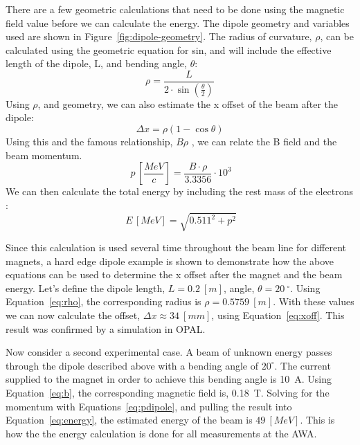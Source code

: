 There are a few geometric calculations that need to be done using the magnetic field value
before we can calculate the energy. The dipole geometry and variables used are shown in Figure~\ref{fig:dipole-geometry}.
The radius of curvature, $\rho$, can be calculated using the geometric equation for sin, and 
will include the effective length of the dipole, L, and bending angle, $\theta$:
\begin{equation}
	\rho = \frac{L}{2\cdot \sin(\frac{\theta}{2})}
\end{equation}\label{eq:rho}
Using $\rho$, and geometry, we can also estimate the x offset of the
beam after the dipole: 
\begin{equation}
	\Delta x = \rho \left( 1- \cos\theta \right)
\end{equation}\label{eq:xoff}
Using this and the famous relationship, $B\rho$ \cite{Wiedemann},
we can relate the B field and the beam momentum. %
\begin{equation}
	\SI{}{p\,\left[\frac{MeV}{c}\right]} = \frac{B\cdot \rho}{3.3356}\cdot 10^3
	\label{eq:pdipole}
\end{equation}
We can then calculate the total energy by including the rest mass of the electrons \cite{Griffiths}:
\begin{equation}
	\SI{}{E\,[MeV]} = \sqrt{0.511^2+p^2}
	\label{eq:energy}
\end{equation}

Since this calculation is used several time throughout the 
beam line for different magnets, a hard edge dipole example is shown 
to demonstrate how the above equations can be used to determine
the x offset after the magnet and the beam energy. 
Let's define the dipole length, $L=\SI{0.2}{[m]}$, angle, $\theta=\SI{20}{^\circ}$. 
Using Equation~\ref{eq:rho}, 
the corresponding radius is $\rho = \SI{0.5759}{[m]}$. 
With these values we can now calculate the offset, $\Delta x \approx \SI{34}{[mm]}$, 
using Equation~\ref{eq:xoff}. This result was confirmed by a simulation in OPAL. 

Now consider a second experimental case.
A beam of unknown energy passes through the dipole described above
with a bending angle of $20^\circ$. 
The current supplied to the magnet in order to achieve this bending angle is \SI{10}{A}.
Using Equation~\ref{eq:b}, the corresponding magnetic field is, \SI{0.18}{T}.
Solving for the momentum with Equations~\ref{eq:pdipole}, and pulling the 
result into Equation~\ref{eq:energy}, 
the estimated energy of the beam is $\SI{49}{[MeV]}$.
This is how the the energy calculation is done for all measurements at the AWA.



